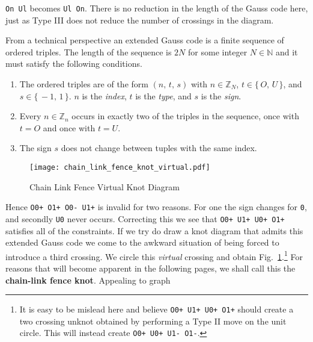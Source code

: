         \texttt{On Ul} becomes \texttt{Ul On}. There is no reduction in the
        length of the Gauss code here, just as Type III does not reduce the
        number of crossings in the diagram.
        \par\hfill\par
        From a technical perspective an extended Gauss code is a
        finite sequence of ordered triples. The length of the sequence is
        $2N$ for some integer $N\in\mathbb{N}$ and it must satisfy
        the following conditions.
        \begin{enumerate}
            \item
                The ordered triples are of the form $(n,\,t,\,s)$ with
                $n\in\mathbb{Z}_{N}$, $t\in\{\,O,\,U\,\}$, and
                $s\in\{\,-1,\,1\,\}$. $n$ is the \textit{index}, $t$ is the
                \textit{type}, and $s$ is the \textit{sign}.
            \item
                Every $n\in\mathbb{Z}_{n}$ occurs in exactly two of the
                triples in the sequence, once with $t=O$ and once with
                $t=U$.
            \item
                The sign $s$ does not change between tuples with the same
                index.
        \end{enumerate}
        \begin{figure}
            \centering
            \texttt{[image: chain\_link\_fence\_knot\_virtual.pdf]}
            \caption{Chain Link Fence Virtual Knot Diagram}
            \label{fig:chain_link_fence_knot_virtual}
        \end{figure}
        Hence \texttt{O0+ O1+ O0- U1+} is invalid for two reasons. For one
        the sign changes for \texttt{0}, and secondly \texttt{U0} never occurs.
        Correcting this we see that \texttt{O0+ U1+ U0+ O1+} satisfies all of
        the constraints. If we try do draw a knot diagram that admits this
        extended Gauss code we come to the awkward situation of being forced
        to introduce a third crossing. We circle this \textit{virtual} crossing
        and obtain Fig.~\ref{fig:chain_link_fence_knot_virtual}.\footnote{%
            It is easy to be mislead here and believe
            \texttt{O0+ U1+ U0+ O1+} should create a two crossing unknot
            obtained by performing a Type II move on the unit circle. This will
            instead create \texttt{O0+ U0+ U1- O1-}.
        }
        For reasons that will become apparent in the following pages, we shall
        call this the \textbf{chain-link fence knot}. Appealing to graph
